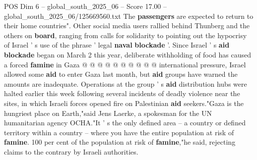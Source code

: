 \begin{textsample}{POS Dim 6 – global\_south\_2025\_06 – Score 17.00 – global\_south\_2025\_06/125669560.txt}
The \textbf{passengers} are expected to return to their home countries".
Other social media users rallied behind Thunberg and the others on \textbf{board}, ranging from calls for solidarity to pointing out the hypocrisy of Israel ' s use of the phrase ' legal \textbf{naval} \textbf{blockade} '.
Since Israel ' s \textbf{aid} \textbf{blockade} began on March 2 this year, deliberate withholding of food has caused a forced \textbf{famine} in Gaza @ @ @ @ @ @ @ @ @ @ international pressure, Israel allowed some \textbf{aid} to enter Gaza last month, but \textbf{aid} groups have warned the amounts are inadequate.
Operations at the group ' s \textbf{aid} distribution hubs were halted earlier this week following several incidents of deadly violence near the sites, in which Israeli forces opened fire on Palestinian \textbf{aid} seekers."Gaza is the hungriest place on Earth,"said Jens Laerke, a spokesman for the UN humanitarian agency OCHA."It ' s the only defined area -- a country or defined territory within a country -- where you have the entire population at risk of \textbf{famine}. 100 per cent of the population at risk of \textbf{famine},"he said, rejecting claims to the contrary by Israeli authorities.

\end{textsample}
